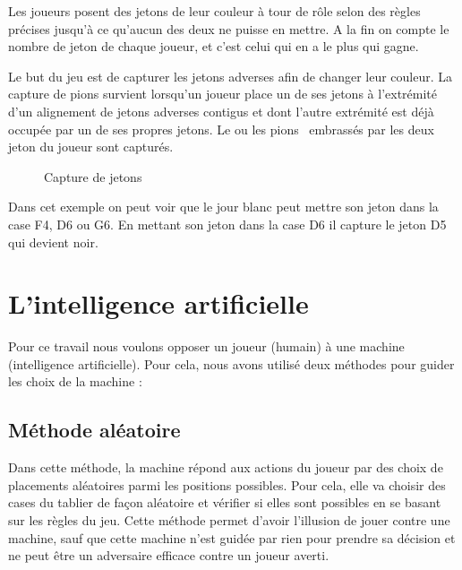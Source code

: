 \documentclass[11pt]{article}
\begin{document}
Les joueurs posent des jetons de leur couleur à tour de rôle selon des
règles précises jusqu'à ce qu'aucun des deux ne puisse en mettre.
A la fin on compte le nombre de jeton de chaque joueur, et c'est celui qui en
a le plus qui gagne.

Le but du jeu est de capturer les jetons adverses afin de changer leur
couleur. La capture de pions survient lorsqu'un joueur place un de ses jetons
à l'extrémité d'un alignement de jetons adverses contigus et dont
l'autre extrémité est déjà occupée par un de ses propres
jetons. Le ou les pions \ embrassés par les deux jeton du joueur sont
capturés.


\begin{figure}[h]
  \caption {Capture de jetons}
  \noindent{}
\end{figure}

Dans cet exemple on peut voir que le jour blanc peut mettre son jeton dans la
case F4, D6 ou G6. En mettant son jeton dans la case D6 il capture le jeton D5
qui devient noir.

\section{L'intelligence artificielle}

Pour ce travail nous voulons opposer un joueur (humain) à une machine
(intelligence artificielle). Pour cela, nous avons utilisé deux
méthodes pour guider les choix de la machine :

\subsection{Méthode aléatoire}

Dans cette méthode, la machine répond aux actions du joueur par des
choix de placements aléatoires parmi les positions possibles. Pour cela,
elle va choisir des cases du tablier de fa{\c c}on aléatoire et
vérifier si elles sont possibles en se basant sur les règles du jeu.
Cette méthode permet d'avoir l'illusion de jouer contre une machine, sauf
que cette machine n'est guidée par rien pour prendre sa décision et ne
peut être un adversaire efficace contre un joueur averti.
\end{document}
